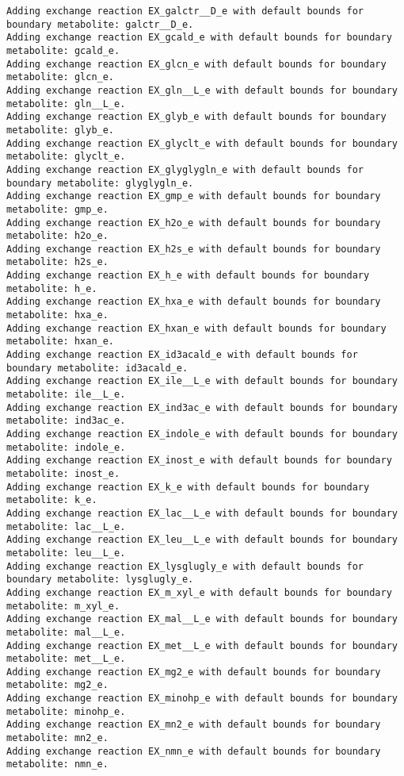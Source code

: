 \documentclass[
  letterpaper,
  DIV=11,
  numbers=noendperiod]{scrartcl}
\begin{document}
\begin{verbatim}
Adding exchange reaction EX_galctr__D_e with default bounds for boundary metabolite: galctr__D_e.
Adding exchange reaction EX_gcald_e with default bounds for boundary metabolite: gcald_e.
Adding exchange reaction EX_glcn_e with default bounds for boundary metabolite: glcn_e.
Adding exchange reaction EX_gln__L_e with default bounds for boundary metabolite: gln__L_e.
Adding exchange reaction EX_glyb_e with default bounds for boundary metabolite: glyb_e.
Adding exchange reaction EX_glyclt_e with default bounds for boundary metabolite: glyclt_e.
Adding exchange reaction EX_glyglygln_e with default bounds for boundary metabolite: glyglygln_e.
Adding exchange reaction EX_gmp_e with default bounds for boundary metabolite: gmp_e.
Adding exchange reaction EX_h2o_e with default bounds for boundary metabolite: h2o_e.
Adding exchange reaction EX_h2s_e with default bounds for boundary metabolite: h2s_e.
Adding exchange reaction EX_h_e with default bounds for boundary metabolite: h_e.
Adding exchange reaction EX_hxa_e with default bounds for boundary metabolite: hxa_e.
Adding exchange reaction EX_hxan_e with default bounds for boundary metabolite: hxan_e.
Adding exchange reaction EX_id3acald_e with default bounds for boundary metabolite: id3acald_e.
Adding exchange reaction EX_ile__L_e with default bounds for boundary metabolite: ile__L_e.
Adding exchange reaction EX_ind3ac_e with default bounds for boundary metabolite: ind3ac_e.
Adding exchange reaction EX_indole_e with default bounds for boundary metabolite: indole_e.
Adding exchange reaction EX_inost_e with default bounds for boundary metabolite: inost_e.
Adding exchange reaction EX_k_e with default bounds for boundary metabolite: k_e.
Adding exchange reaction EX_lac__L_e with default bounds for boundary metabolite: lac__L_e.
Adding exchange reaction EX_leu__L_e with default bounds for boundary metabolite: leu__L_e.
Adding exchange reaction EX_lysglugly_e with default bounds for boundary metabolite: lysglugly_e.
Adding exchange reaction EX_m_xyl_e with default bounds for boundary metabolite: m_xyl_e.
Adding exchange reaction EX_mal__L_e with default bounds for boundary metabolite: mal__L_e.
Adding exchange reaction EX_met__L_e with default bounds for boundary metabolite: met__L_e.
Adding exchange reaction EX_mg2_e with default bounds for boundary metabolite: mg2_e.
Adding exchange reaction EX_minohp_e with default bounds for boundary metabolite: minohp_e.
Adding exchange reaction EX_mn2_e with default bounds for boundary metabolite: mn2_e.
Adding exchange reaction EX_nmn_e with default bounds for boundary metabolite: nmn_e.

\end{verbatim}
\end{document}
